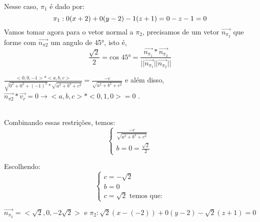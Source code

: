\documentclass{article} %
\begin{document}
\begin{itemize}
   Nesse caso, $\pi_1$ é dado por: \\
   \begin{equation}
    \pi_1: 0(x+2) + 0(y-2) -1 (z+1) = 0 \\ -z-1=0
   \end{equation}
   Vamos tomar agora para o vetor normal a $\pi_2$, precisamos de um vetor $\overrightarrow{n_{\pi_2}}$ que forme com $\overrightarrow{n_{\pi2}}$ um angulo de 45°, isto é, 
   \begin{equation}
    \frac{\sqrt{2}}{2} = \text{cos 45°} = \frac{\overrightarrow{n_{\pi_1}}* \overrightarrow{n_{\pi_2}}}{|| \overrightarrow{n_{\pi_1}}|| \overrightarrow{n_{\pi_2}}||} 
   \end{equation}
   \begin {centering}
   $\frac{<0,0,-1> * <a,b,c>}{\sqrt{0^2+ 0^2 + (-1)^2} * \sqrt{a^2 + b^2 + c^2}} =
   \frac{-c}{\sqrt{a^2 + b^2 + c^2}}$ e além disso, $\overrightarrow{n_{\pi2}} * \overrightarrow{v_r} = 0 \rightarrow <a,b,c> * <0,1,0> = 0$ .
    \end{centering} \\
    Combinando essas restrições, temos: \\
    \begin{equation}
        \begin{cases}
            \frac{-c}{\sqrt{a^2 + b^2+c^2}} \\
            b = 0                             = \frac{\sqrt{2}}{2}
        \end{cases}
    \end{equation}

    Escolhendo: 
    \begin{equation}
        \begin{cases}
            c = - \sqrt{2} \\
            b= 0 \\
            c = \sqrt{2} \text{       temos que:}
        \end{cases}
    \end{equation}

    $ \overrightarrow{n_{\pi_2}} = < \sqrt{2}, 0, -2 \sqrt{2}> \text{ e } \pi_2: \sqrt{2}(x-(-2)) + 0(y-2) - \sqrt{2}(z+1) = 0 $


\end{itemize}
\end{document}
